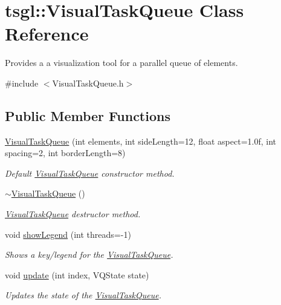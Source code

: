 \hypertarget{classtsgl_1_1_visual_task_queue}{}\section{tsgl\+:\+:Visual\+Task\+Queue Class Reference}
\label{classtsgl_1_1_visual_task_queue}


Provides a a visualization tool for a parallel queue of elements.  




{\ttfamily \#include $<$Visual\+Task\+Queue.\+h$>$}

\subsection*{Public Member Functions}
\begin{DoxyCompactItemize}
\item 
\hyperlink{classtsgl_1_1_visual_task_queue_ad82aabf35ec367b2b0c5894999f5e76e}{Visual\+Task\+Queue} (int elements, int side\+Length=12, float aspect=1.\+0f, int spacing=2, int border\+Length=8)
\begin{DoxyCompactList}\small\item\em Default \hyperlink{classtsgl_1_1_visual_task_queue}{Visual\+Task\+Queue} constructor method. \end{DoxyCompactList}\item 
\hyperlink{classtsgl_1_1_visual_task_queue_ae961a57508ba1d38570d1431c4367a09}{$\sim$\+Visual\+Task\+Queue} ()
\begin{DoxyCompactList}\small\item\em \hyperlink{classtsgl_1_1_visual_task_queue}{Visual\+Task\+Queue} destructor method. \end{DoxyCompactList}\item 
void \hyperlink{classtsgl_1_1_visual_task_queue_a7153e63b78fc257f162410c3e55e13dc}{show\+Legend} (int threads=-\/1)
\begin{DoxyCompactList}\small\item\em Shows a key/legend for the \hyperlink{classtsgl_1_1_visual_task_queue}{Visual\+Task\+Queue}. \end{DoxyCompactList}\item 
void \hyperlink{classtsgl_1_1_visual_task_queue_a2fc5733a57213a6eee116408738851fc}{update} (int index, V\+Q\+State state)
\begin{DoxyCompactList}\small\item\em Updates the state of the \hyperlink{classtsgl_1_1_visual_task_queue}{Visual\+Task\+Queue}. \end{DoxyCompactList}\item 

\end{DoxyCompactItemize}

